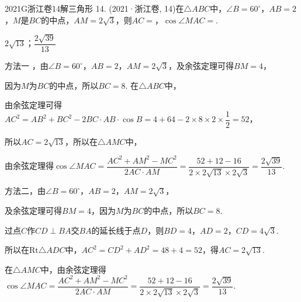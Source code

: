 
\begin{problem}{2021}{G}{浙江卷}{14}{解三角形}
14. (2021·浙江卷, 14)在$\triangle ABC$中，$\angle B=60^\circ$，$AB=2$，$M$是$BC$的中点，$AM=2\sqrt{3}$，则$AC=$\underline{\hspace{4em}}，$\cos\angle MAC=$\underline{\hspace{4em}}.
\end{problem}

\begin{answer}
$2\sqrt{13}$；$\dfrac{2\sqrt{39}}{13}$
\end{answer}

\begin{solutions}
方法一 ，由$\angle B=60^\circ$，$AB=2$，$AM=2\sqrt{3}$，及余弦定理可得$BM=4$，

因为$M$为$BC$的中点，所以$BC=8$. 在$\triangle ABC$中，

由余弦定理可得$AC^2=AB^2+BC^2-2BC\cdot AB\cdot\cos B=4+64-2\times 8\times 2\times\dfrac{1}{2}=52$，

所以$AC=2\sqrt{13}$，所以在$\triangle AMC$中，

由余弦定理得$\cos\angle MAC=\dfrac{AC^2+AM^2-MC^2}{2AC\cdot AM}=\dfrac{52+12-16}{2\times 2\sqrt{13}\times 2\sqrt{3}}=\dfrac{2\sqrt{39}}{13}$.

方法二，由$\angle B=60^\circ$，$AB=2$，$AM=2\sqrt{3}$，

及余弦定理可得$BM=4$，因为$M$为$BC$的中点，所以$BC=8$. 

过点$C$作$CD\perp BA$交$BA$的延长线于点$D$，则$BD=4$，$AD=2$，$CD=4\sqrt{3}$. 

所以在$\mathrm{Rt}\triangle ADC$中，$AC^2=CD^2+AD^2=48+4=52$，得$AC=2\sqrt{13}$. 

在$\triangle AMC$中，由余弦定理得$\cos\angle MAC=\dfrac{AC^2+AM^2-MC^2}{2AC\cdot AM}=\dfrac{52+12-16}{2\times 2\sqrt{13}\times 2\sqrt{3}}=\dfrac{2\sqrt{39}}{13}$.
\end{solutions}